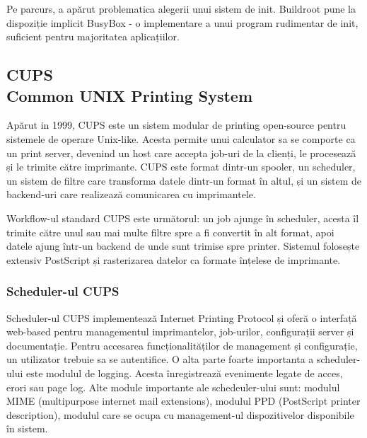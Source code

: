 \documentclass[a4paper, 12pt, twoside]{report}
\begin{document}
Pe parcurs, a apărut problematica alegerii unui sistem de init. Buildroot pune la dispoziție implicit BusyBox - o implementare a unui program rudimentar de init, suficient pentru majoritatea aplicațiilor.
		\subsection[CUPS]{CUPS\\ {\normalsize Common UNIX Printing System}}
Apărut in 1999, CUPS este un sistem modular de printing open-source pentru sistemele de operare Unix-like. Acesta permite unui calculator sa se comporte ca un print server, devenind un host care accepta job-uri de la clienți, le procesează și le trimite către imprimante.
CUPS este format dintr-un spooler, un scheduler, un sistem de filtre care transforma datele dintr-un format în altul, și un sistem de backend-uri care realizează comunicarea cu imprimantele.

Workflow-ul standard CUPS este următorul: un job ajunge în scheduler, acesta îl trimite către unul sau mai multe filtre spre a fi convertit în alt format, apoi datele ajung într-un backend de unde sunt trimise spre printer. Sistemul folosește extensiv PostScript și rasterizarea datelor ca formate înțelese de imprimante.
			\subsubsection{Scheduler-ul CUPS}
Scheduler-ul CUPS implementează Internet Printing Protocol și oferă o interfață web-based pentru managementul imprimantelor, job-urilor, configurații server și documentație. Pentru accesarea funcționalităților de management și configurație, un utilizator trebuie sa se autentifice.
O alta parte foarte importanta a scheduler-ului este modulul de logging. Acesta înregistrează evenimente legate de acces, erori sau page log.
Alte module importante ale schedeuler-ului sunt: modulul MIME (multipurpose internet mail extensions), modulul PPD (PostScript printer description), modulul care se ocupa cu management-ul dispozitivelor disponibile în sistem.
\end{document}
